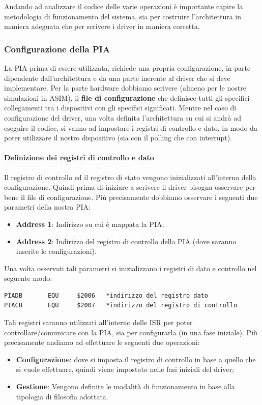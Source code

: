 Andando ad analizzare il codice delle varie operazioni è importante capire la metodologia di funzionamento del sistema, sia per costruire l'architettura in maniera adeguata che per scrivere i driver in maniera corretta.

\subsubsection{Configurazione della PIA}
La PIA prima di essere utilizzata, richiede una propria configurazione, in parte dipendente dall'architettura e da una parte inerente al driver che si deve implementare.
Per la parte hardware dobbiamo scrivere (almeno per le nostre simulazioni in ASIM), il \textbf{file di configurazione} che definisce tutti gli specifici collegamenti tra i dispositivi con gli specifici significati. Mentre nel caso di configurazione del driver, una volta definita l'architettura su cui si andrà ad eseguire il codice, si vanno ad impostare i registri di controllo e dato, in modo da poter utilizzare il nostro dispositivo (sia con il polling che con interrupt).

\paragraph{Definizione dei registri di controllo e dato\\}\label{par:cnt-stt} 
Il registro di controllo ed il registro di stato vengono inizializzati all'interno della configurazione. Quindi prima di iniziare a scrivere il driver bisogna osservare per bene il file di configurazione. Più precisamente dobbiamo osservare i seguenti due parametri della nostra PIA:
\begin{itemize}
    \item \textbf{Address 1}: Indirizzo su cui è mappata la PIA;
    \item \textbf{Address 2}: Indirizzo del registro di controllo della PIA (dove saranno inserite le configurazioni).
\end{itemize}

Una volta osservati tali parametri si inizializzano i registri di dato e controllo nel seguente modo:
\begin{lstlisting}
PIADB       EQU     $2006	*indirizzo del registro dato 
PIACB       EQU     $2007	*indirizzo del registro di controllo
\end{lstlisting}

Tali registri saranno utilizzati all'interno delle ISR per poter controllare/comunicare con la PIA, sia per configurarla (in una fase iniziale). Più precisamente andiamo ad effettuare le seguenti due operazioni:
\begin{itemize}
    \item \textbf{Configurazione}: dove si imposta il registro di controllo in base a quello che si vuole effettuare, quindi viene impostato nelle fasi iniziali del driver;
    \item \textbf{Gestione}: Vengono definite le modalità di funzionamento in base alla tipologia di filosofia adottata.
\end{itemize}

